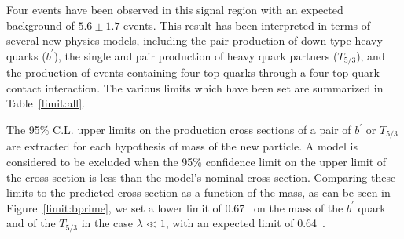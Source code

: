 
Four events have been observed in this signal region with an expected background of $5.6\pm1.7$ events. 
This result has been interpreted in terms of several new physics models,
including the pair production of down-type heavy quarks ($b^\prime$),
the single and pair production of heavy quark partners ($T_{5/3}$),
and the production of events containing four top quarks through a four-top quark contact interaction. 
The various limits which have been set are summarized in Table~\ref{limit:all}.

The 95\% C.L. upper limits on the production cross sections of a pair of $b^\prime$ or $T_{5/3}$ are extracted for each hypothesis of mass of the new particle.
A model is considered to be excluded when the 95\% confidence limit on the upper limit of the cross-section is less than the model's nominal cross-section.
Comparing these limits to the predicted cross section as a function of the mass, as can be seen in Figure~\ref{limit:bprime}, we set a lower limit of 0.67~\TeV{} on the mass of the $b^\prime$ quark and of the $T_{5/3}$ in the case $\lambda\ll1$, with an expected limit of 0.64~\TeV{}.


